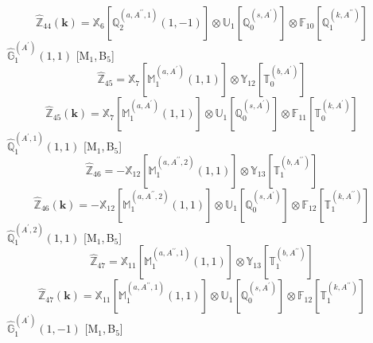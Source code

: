 \documentclass[fleqn,10pt,landscape]{article}
\begin{document}
\begin{itemize}
\begin{dmath*}
\hat{\mathbb{Z}}_{44}(\bm{k})=\mathbb{X}_{6}[\mathbb{Q}_{2}^{(a,A^{\prime\prime},1)}(1,-1)] \otimes\mathbb{U}_{1}[\mathbb{Q}_{0}^{(s,A^{\prime})}] \otimes\mathbb{F}_{10}[\mathbb{Q}_{1}^{(k,A^{\prime\prime})}]
\end{dmath*}
\vspace{4mm}
\noindent {} $\,\,\,\hat{\mathbb{G}}_{1}^{(A^{\prime})}(1,1)$ [M$_{1}$,\,B$_{5}$]
\begin{dmath*}
\hat{\mathbb{Z}}_{45}=\mathbb{X}_{7}[\mathbb{M}_{1}^{(a,A^{\prime})}(1,1)] \otimes\mathbb{Y}_{12}[\mathbb{T}_{0}^{(b,A^{\prime})}]
\end{dmath*}
\begin{dmath*}
\hat{\mathbb{Z}}_{45}(\bm{k})=\mathbb{X}_{7}[\mathbb{M}_{1}^{(a,A^{\prime})}(1,1)] \otimes\mathbb{U}_{1}[\mathbb{Q}_{0}^{(s,A^{\prime})}] \otimes\mathbb{F}_{11}[\mathbb{T}_{0}^{(k,A^{\prime})}]
\end{dmath*}
\vspace{4mm}
\noindent {} $\,\,\,\hat{\mathbb{Q}}_{1}^{(A^{\prime},1)}(1,1)$ [M$_{1}$,\,B$_{5}$]
\begin{dmath*}
\hat{\mathbb{Z}}_{46}=- \mathbb{X}_{12}[\mathbb{M}_{1}^{(a,A^{\prime\prime},2)}(1,1)] \otimes\mathbb{Y}_{13}[\mathbb{T}_{1}^{(b,A^{\prime\prime})}]
\end{dmath*}
\begin{dmath*}
\hat{\mathbb{Z}}_{46}(\bm{k})=- \mathbb{X}_{12}[\mathbb{M}_{1}^{(a,A^{\prime\prime},2)}(1,1)] \otimes\mathbb{U}_{1}[\mathbb{Q}_{0}^{(s,A^{\prime})}] \otimes\mathbb{F}_{12}[\mathbb{T}_{1}^{(k,A^{\prime\prime})}]
\end{dmath*}
\vspace{4mm}
\noindent {} $\,\,\,\hat{\mathbb{Q}}_{1}^{(A^{\prime},2)}(1,1)$ [M$_{1}$,\,B$_{5}$]
\begin{dmath*}
\hat{\mathbb{Z}}_{47}=\mathbb{X}_{11}[\mathbb{M}_{1}^{(a,A^{\prime\prime},1)}(1,1)] \otimes\mathbb{Y}_{13}[\mathbb{T}_{1}^{(b,A^{\prime\prime})}]
\end{dmath*}
\begin{dmath*}
\hat{\mathbb{Z}}_{47}(\bm{k})=\mathbb{X}_{11}[\mathbb{M}_{1}^{(a,A^{\prime\prime},1)}(1,1)] \otimes\mathbb{U}_{1}[\mathbb{Q}_{0}^{(s,A^{\prime})}] \otimes\mathbb{F}_{12}[\mathbb{T}_{1}^{(k,A^{\prime\prime})}]
\end{dmath*}
\vspace{4mm}
\noindent {} $\,\,\,\hat{\mathbb{G}}_{1}^{(A^{\prime})}(1,-1)$ [M$_{1}$,\,B$_{5}$]
\begin{dmath*}

\end{dmath*}
\end{itemize}
\end{document}
